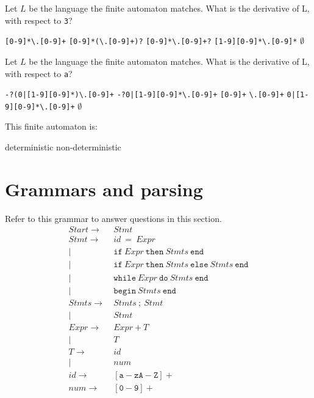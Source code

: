 \documentclass[addpoints]{exam}
\begin{document}
\begin{questions}
\answerline

\question Let $L$ be the language the finite automaton matches. What is the derivative of L, with respect to \verb$3$?

\begin{choices}
\choice \verb$[0-9]*\.[0-9]+$
\choice \verb$[0-9]*(\.[0-9]+)?$
\choice \verb$[0-9]*\.[0-9]+?$
\choice \verb$[1-9][0-9]*\.[0-9]*$
\choice $\emptyset$
\end{choices}

\answerline

\question Let $L$ be the language the finite automaton matches. What is the derivative of L, with respect to \verb$a$?

\begin{choices}
\choice \verb$-?(0|[1-9][0-9]*)\.[0-9]+$
\choice \verb$-?0|[1-9][0-9]*\.[0-9]+$
\choice \verb$[0-9]+$
\choice \verb$\.[0-9]+$
\choice \verb$0|[1-9][0-9]*\.[0-9]+$
\choice $\emptyset$
\end{choices}

\answerline

\question This finite automaton is:
\begin{oneparchoices}
\choice deterministic
\choice non-deterministic
\end{oneparchoices}
\answerline
\pagebreak

\section{Grammars and parsing}
Refer to this grammar to answer questions in this section.
\begin{align*}
Start \to&~Stmt\\
Stmt \to&~id~\mathtt{=}~Expr\\
 |&~\mathtt{if}~Expr~\mathtt{then}~Stmts~\mathtt{end}\\
 |&~\mathtt{if}~Expr~\mathtt{then}~Stmts~\mathtt{else}~Stmts~\mathtt{end}\\
 |&~\mathtt{while}~Expr~\mathtt{do}~Stmts~\mathtt{end}\\
 |&~\mathtt{begin}~Stmts~\mathtt{end}\\
Stmts \to&~Stmts~\mathtt{;}~Stmt\\
|&~Stmt\\
Expr \to&~Expr~\mathtt{+}~T\\
|&~T\\
T \to&~id\\
|&~num\\
id \to&~\mathtt{[a-zA-Z]+}\\
num \to&~\mathtt{[0-9]+}
\end{align*}


\end{questions}
\end{document}
